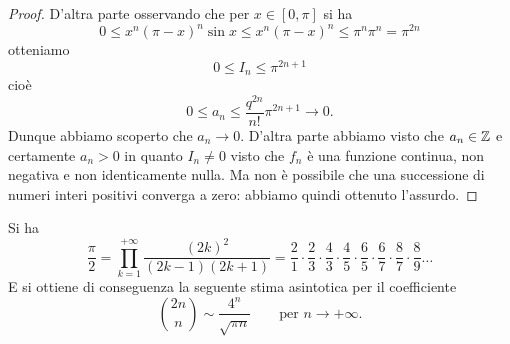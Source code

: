 \begin{proof}
D'altra parte osservando che per $x\in [0,\pi]$ si ha
\[
  0 \le x^n(\pi-x)^n \sin x \le x^n (\pi-x)^n \le \pi^n \pi^n = \pi^{2n}
\]
otteniamo
\[
  0 \le I_n \le \pi^{2n+1}
\]
cioè
\[
  0 \le a_n \le \frac{q^{2n}}{n!}\pi^{2n+1} \to 0.
\]
Dunque abbiamo scoperto che $a_n\to 0$. D'altra parte abbiamo visto che
$a_n \in \mathbb Z$ e certamente $a_n > 0$ in quanto $I_n \neq 0$ visto che $f_n$ è
una funzione continua, non negativa e non identicamente nulla.
Ma non è
possibile che una successione di numeri interi positivi converga a zero:
abbiamo quindi ottenuto l'assurdo.
\end{proof}

\begin{theorem}
\label{th:wallis}%
\mymark{*}%
%
%
%
%
Si ha
\[
  \frac{\pi}{2}
  = \prod_{k=1}^{+\infty} \frac{(2k)^2}{(2k-1)(2k+1)}
  = \frac{2}{1}
  \cdot \frac{2}{3}
  \cdot \frac{4}{3}
  \cdot \frac{4}{5}
  \cdot \frac{6}{5}
  \cdot \frac{6}{7}
  \cdot \frac{8}{7}
  \cdot \frac{8}{9}
  \dots
\]
E si ottiene di conseguenza la seguente stima asintotica per
il coefficiente 
\[
 {2n \choose n} \sim \frac{4^n}{\sqrt{\pi n}}
 \qquad \text{per $n\to +\infty$.}
\]
\end{theorem}
%
